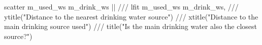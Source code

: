 scatter m_used_ws m_drink_ws  || ///
lfit m_used_ws m_drink_ws, ///
        ytitle("Distance to the nearest drinking water source") ///
        xtitle("Distance to the main drinking source used") ///
        title("Is the main drinking water also the closest source?")
